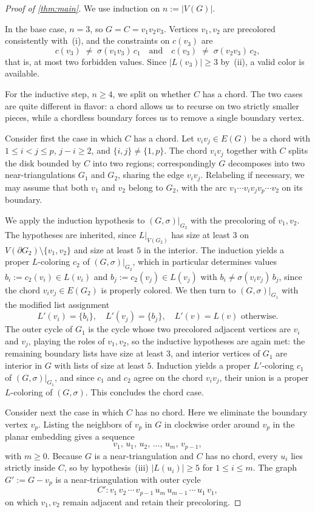 \documentclass[11pt,a4paper]{article}
\theoremstyle{plain}
\theoremstyle{definition}
\newcommand{\E}{E}
\newcommand{\V}{V}
\newcommand{\Gs}{(G,\sigma)}
\begin{document}
\begin{proof}[Proof of \cref{thm:main}]
We use induction on $n:=|\V(G)|$.

In the base case, $n=3$, so $G=C=v_1v_2v_3$. Vertices $v_1,v_2$ are
precolored consistently with~(i), and the constraints on $c(v_3)$
are
\[
c(v_3)\;\ne\;\sigma(v_1v_3)\,c_1
\quad\text{and}\quad
c(v_3)\;\ne\;\sigma(v_2v_3)\,c_2,
\]
that is, at most two forbidden values. Since $|L(v_3)|\ge 3$
by~(ii), a valid color is available.

For the inductive step, $n\ge 4$, we split on whether $C$ has a
chord. The two cases are quite different in flavor: a chord allows
us to recurse on two strictly smaller pieces, while a chordless
boundary forces us to remove a single boundary vertex.

Consider first the case in which $C$ has a chord. Let
$v_iv_j\in\E(G)$ be a chord with $1\le i<j\le p$, $j-i\ge 2$, and
$\{i,j\}\ne\{1,p\}$. The chord $v_iv_j$ together with $C$ splits
the disk bounded by $C$ into two regions; correspondingly $G$
decomposes into two near-triangulations $G_1$ and $G_2$, sharing
the edge $v_iv_j$. Relabeling if necessary, we may assume that
both $v_1$ and $v_2$ belong to $G_2$, with the arc
$v_1\cdots v_iv_jv_p\cdots v_2$ on its boundary.

We apply the induction hypothesis to $\Gs|_{G_2}$ with the
precoloring of $v_1,v_2$. The hypotheses are inherited, since
$L|_{V(G_2)}$ has size at least $3$ on
$\V(\partial G_2)\setminus\{v_1,v_2\}$ and size at least $5$ in the
interior. The induction yields a proper $L$-coloring $c_2$ of
$\Gs|_{G_2}$, which in particular determines values
$b_i:=c_2(v_i)\in L(v_i)$ and $b_j:=c_2(v_j)\in L(v_j)$ with
$b_i\ne\sigma(v_iv_j)\,b_j$, since the chord $v_iv_j\in\E(G_2)$ is
properly colored. We then turn to $\Gs|_{G_1}$ with the modified
list assignment
\[
   L'(v_i)=\{b_i\},\quad L'(v_j)=\{b_j\},\quad
   L'(v)=L(v)\text{ otherwise.}
\]
The outer cycle of $G_1$ is the cycle whose two precolored adjacent
vertices are $v_i$ and $v_j$, playing the roles of $v_1,v_2$, so
the inductive hypotheses are again met: the remaining boundary
lists have size at least $3$, and interior vertices of $G_1$ are
interior in $G$ with lists of size at least $5$. Induction yields a
proper $L'$-coloring $c_1$ of $\Gs|_{G_1}$, and since $c_1$ and
$c_2$ agree on the chord $v_iv_j$, their union is a proper
$L$-coloring of $\Gs$. This concludes the chord case.

Consider next the case in which $C$ has no chord. Here we
eliminate the boundary vertex $v_p$. Listing the neighbors of $v_p$
in $G$ in clockwise order around $v_p$ in the planar embedding
gives a sequence
\[
v_1,\,u_1,\,u_2,\,\dots,\,u_m,\,v_{p-1},
\]
with $m\ge 0$. Because $G$ is a near-triangulation and $C$ has no
chord, every $u_i$ lies strictly inside $C$, so by hypothesis~(iii)
$|L(u_i)|\ge 5$ for $1\le i\le m$. The graph $G':=G-v_p$ is a
near-triangulation with outer cycle
\[
   C'\colon v_1\,v_2\,\cdots\,v_{p-1}\,u_m\,u_{m-1}\,\cdots\,u_1\,v_1,
\]
on which $v_1,v_2$ remain adjacent and retain their precoloring.


\end{proof}
\end{document}
